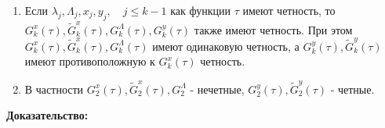 \begin{utv}
\begin{enumerate}

\item 
Если $\lambda_j,\Lambda_j,x_j,y_j, \quad j \le k-1$ как функции $\tau$ имеют четность, то \newline $G_k^x(\tau),\tilde G_k^x(\tau),G_k^\Lambda(\tau), G_k^y(\tau)$ также имеют четность. При этом $G_k^x(\tau),\tilde G_k^x(\tau),G_k^\Lambda(\tau)$ имеют одинаковую четность, а $G_k^y(\tau), \tilde G_k^y(\tau)$ имеют противоположную к 
$G_k^x(\tau)$ четность. 

\item В частности $G_2^x(\tau), \tilde G_2^x(\tau), G_2^\Lambda$ - нечетные, $G_2^y(\tau), \tilde G_2^y(\tau)$ - четные.
\end{enumerate}
\end{utv}
\textbf{Доказательство:}\nopagebreak[4]

